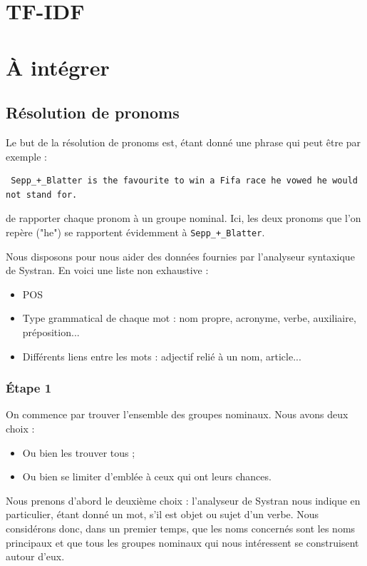 \documentclass[a4paper, 12pt]{article}
\begin{document}
\section{TF-IDF}

\section{À intégrer}

\subsection{Résolution de pronoms}

Le but de la résolution de pronoms est, étant donné une phrase qui peut être par exemple :

\begin{verbatim}
 Sepp_+_Blatter is the favourite to win a Fifa race he vowed he would not stand for.
\end{verbatim}
de rapporter chaque pronom à un groupe nominal. Ici, les deux pronoms que l'on repère ("he") se rapportent évidemment à \verb|Sepp_+_Blatter|.

Nous disposons pour nous aider des données fournies par l'analyseur syntaxique de Systran. En voici une liste non exhaustive :
\begin{itemize}
 \item POS
 \item Type grammatical de chaque mot : nom propre, acronyme, verbe, auxiliaire, préposition...
 \item Différents liens entre les mots : adjectif relié à un nom, article...
\end{itemize}


\subsubsection{Étape 1}
On commence par trouver l'ensemble des groupes nominaux. Nous avons deux choix :
\begin{itemize}
 \item Ou bien les trouver tous ;
 \item Ou bien se limiter d'emblée à ceux qui ont leurs chances.
\end{itemize}

Nous prenons d'abord le deuxième choix : l'analyseur de Systran nous indique en particulier, étant donné un mot, s'il est objet ou sujet d'un verbe. Nous considérons donc, dans un premier temps, que les noms concernés sont les noms principaux et que tous les groupes nominaux qui nous intéressent se construisent autour d'eux.
\end{document}
